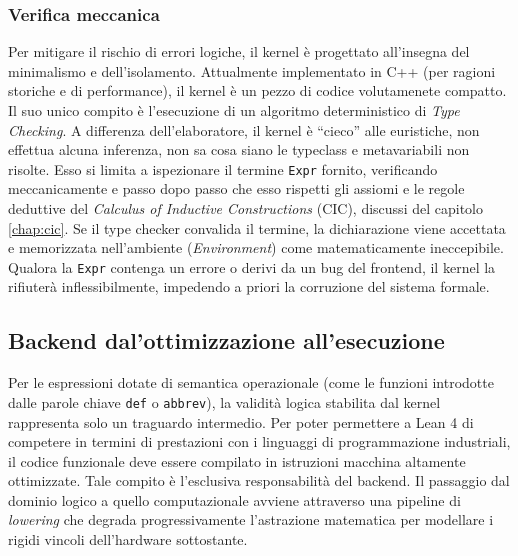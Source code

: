 \subsubsection{Verifica meccanica}
Per mitigare il rischio di errori logiche, il kernel è progettato all'insegna del minimalismo e dell'isolamento. Attualmente implementato in C++ (per ragioni storiche e di performance), il kernel 
è un pezzo di codice volutamenete compatto. Il suo unico compito è l'esecuzione di un algoritmo deterministico di \textit{Type Checking}. A differenza dell'elaboratore, il kernel è ``cieco'' alle 
euristiche, non effettua alcuna inferenza, non sa cosa siano le typeclass e metavariabili non risolte. Esso si limita a ispezionare il termine \texttt{Expr} fornito, verificando meccanicamente e 
passo dopo passo che esso rispetti gli assiomi e le regole deduttive del \textit{Calculus of Inductive Constructions} (CIC), discussi del capitolo \ref{chap:cic}. Se il type checker convalida il 
termine, la dichiarazione viene accettata e memorizzata nell'ambiente (\textit{Environment}) come matematicamente ineccepibile. Qualora la \texttt{Expr} contenga un errore o derivi da un bug del 
frontend, il kernel la rifiuterà inflessibilmente, impedendo a priori la corruzione del sistema formale.

\subsection{Backend dal'ottimizzazione all'esecuzione}
Per le espressioni dotate di semantica operazionale (come le funzioni introdotte dalle parole chiave \texttt{def} o \texttt{abbrev}), la validità logica stabilita dal kernel rappresenta solo un traguardo 
intermedio. Per poter permettere a Lean 4 di competere in termini di prestazioni con i linguaggi di programmazione industriali, il codice funzionale deve essere compilato in istruzioni macchina altamente 
ottimizzate. Tale compito è l'esclusiva responsabilità del backend. Il passaggio dal dominio logico a quello computazionale avviene attraverso una pipeline di \emph{lowering} che degrada progressivamente 
l'astrazione matematica per modellare i rigidi vincoli dell'hardware sottostante.

